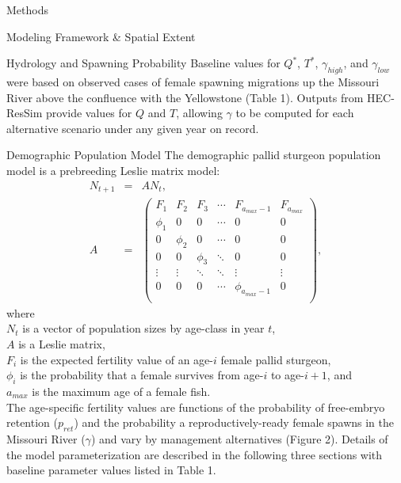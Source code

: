 \documentclass[12pt]{article}
\begin{document}
\begin{section}{Methods}
\begin{subsection}{Modeling Framework \& Spatial Extent}
\begin{subsubsection}{Hydrology and Spawning Probability}
Baseline values for $Q^{*}$, $T^{*}$, $\gamma_{high}$, and $\gamma_{low}$ were based on observed cases of female spawning migrations up the Missouri River above the confluence with the Yellowstone (Table 1).  Outputs from HEC-ResSim provide values for $Q$ and $T$, allowing $\gamma$ to be computed for each alternative scenario under any given year on record.   
\end{subsubsection} 

\begin{subsubsection}{Demographic Population Model}
The demographic pallid sturgeon population model is a prebreeding Leslie matrix model:
\begin{eqnarray}
N_{t+1} & = & AN_{t},\\
A & = &  \begin{pmatrix}
F_1 & F_2 & F_3 & \cdots & F_{a_{max}-1} & F_{a_{max}}\\
\phi_1 & 0 & 0 & \cdots  & 0 & 0\\
0 & \phi_2 & 0 & \cdots  & 0 & 0\\
0 & 0 & \phi_3 & \ddots & 0 & 0\\
\vdots & \vdots & \ddots  & \ddots & \vdots & \vdots\\
0 & 0 & 0 & \cdots & \phi_{a_{max}-1} & 0\\
\end{pmatrix},
\end{eqnarray}
where\\
\hspace*{0.5cm}$N_t$ is a vector of population sizes by age-class in year $t$,\\
\hspace*{0.5cm}$A$ is a Leslie matrix,\\
\hspace*{0.5cm}$F_i$ is the expected fertility value of an age-$i$ female pallid sturgeon,\\
\hspace*{0.5cm}$\phi_i$ is the probability that a female survives from age-$i$ to age-$i+1$, and\\
\hspace*{0.5cm}$a_{max}$ is the maximum age of a female fish.\\

The age-specific fertility values are functions of the probability of free-embryo retention ($p_{ret}$) and the probability a reproductively-ready female spawns in the Missouri River ($\gamma$) and vary by management alternatives (Figure 2).  Details of the model parameterization are described in the following three sections with baseline parameter values listed in Table 1.\\


\end{subsubsection}
\end{subsection}
\end{section}
\end{document}
